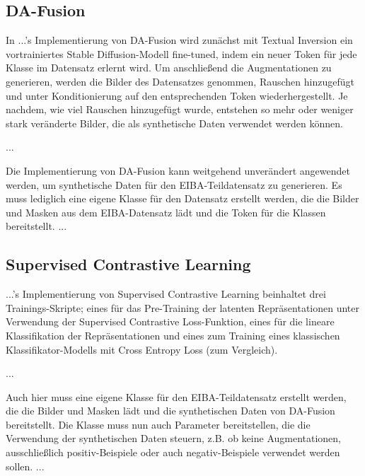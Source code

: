 \subsection{DA-Fusion} \label{sec:impl-da-fusion}


In ...'s Implementierung von DA-Fusion wird zunächst mit Textual Inversion ein vortrainiertes Stable Diffusion-Modell fine-tuned, indem ein neuer Token für jede Klasse im Datensatz erlernt wird. Um anschließend die Augmentationen zu generieren, werden die Bilder des Datensatzes genommen, Rauschen hinzugefügt und unter Konditionierung auf den entsprechenden Token wiederhergestellt. Je nachdem, wie viel Rauschen hinzugefügt wurde, entstehen so mehr oder weniger stark veränderte Bilder, die als synthetische Daten verwendet werden können.

...

Die Implementierung von DA-Fusion kann weitgehend unverändert angewendet werden, um synthetische Daten für den EIBA-Teildatensatz zu generieren. Es muss lediglich eine eigene Klasse für den Datensatz erstellt werden, die die Bilder und Masken aus dem EIBA-Datensatz lädt und die Token für die Klassen bereitstellt. ...

\subsection{Supervised Contrastive Learning} \label{sec:impl-supcon}


...'s Implementierung von Supervised Contrastive Learning beinhaltet drei Trainings-Skripte; eines für das Pre-Training der latenten Repräsentationen unter Verwendung der Supervised Contrastive Loss-Funktion, eines für die lineare Klassifikation der Repräsentationen und eines zum Training eines klassischen Klassifikator-Modells mit Cross Entropy Loss (zum Vergleich).

...

Auch hier muss eine eigene Klasse für den EIBA-Teildatensatz erstellt werden, die die Bilder und Masken lädt und die synthetischen Daten von DA-Fusion bereitstellt. Die Klasse muss nun auch Parameter bereitstellen, die die Verwendung der synthetischen Daten steuern, z.B. ob keine Augmentationen, ausschließlich positiv-Beispiele oder auch negativ-Beispiele verwendet werden sollen. ...

